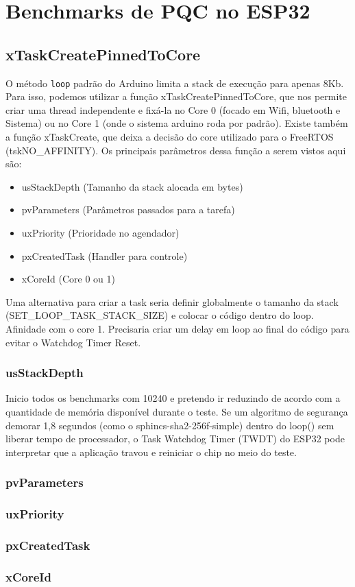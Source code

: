 \chapter{Benchmarks de PQC no ESP32}

\section{xTaskCreatePinnedToCore}
O método \texttt{loop\(\)} padrão do Arduino limita a stack de execução para apenas 8Kb. Para isso, podemos utilizar a função xTaskCreatePinnedToCore, que nos permite criar uma thread independente e fixá-la no Core 0 (focado em Wifi, bluetooth e Sistema) ou no Core 1 (onde o sistema arduino roda por padrão). Existe também a função xTaskCreate, que deixa a decisão do core utilizado para o FreeRTOS (tskNO_AFFINITY). Os principais parâmetros dessa função a serem vistos aqui são:
\begin{itemize}
	\item usStackDepth (Tamanho da stack alocada em bytes)
	\item pvParameters (Parâmetros passados para a tarefa)
	\item uxPriority (Prioridade no agendador)
	\item pxCreatedTask (Handler para controle)
	\item xCoreId (Core 0 ou 1)
\end{itemize}

Uma alternativa para criar a task seria definir globalmente o tamanho da stack (SET_LOOP_TASK_STACK_SIZE) e colocar o código dentro do loop. Afinidade com o core 1. Precisaria criar um delay em loop ao final do código para evitar o Watchdog Timer Reset.

\subsection{usStackDepth}
Inicio todos os benchmarks com 10240 e pretendo ir reduzindo de acordo com a quantidade de memória disponível durante o teste. Se um algoritmo de segurança demorar 1,8 segundos (como o sphincs-sha2-256f-simple) dentro do loop() sem liberar tempo de processador, o Task Watchdog Timer (TWDT) do ESP32 pode interpretar que a aplicação travou e reiniciar o chip no meio do teste.
\subsection{pvParameters}
\subsection{uxPriority}
\subsection{pxCreatedTask}
\subsection{xCoreId}

